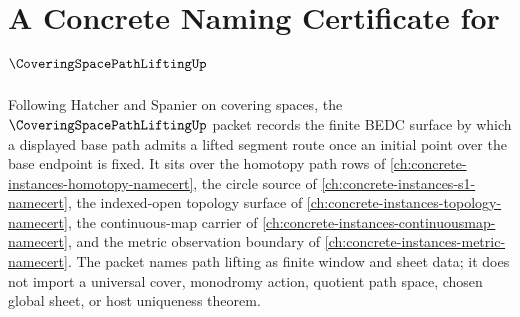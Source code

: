 \chapter{A Concrete Naming Certificate for $\CoveringSpacePathLiftingUp$}
\label{ch:concrete-instances-covering-space-path-lifting-namecert}

Following Hatcher and Spanier on covering spaces, the $\CoveringSpacePathLiftingUp$ packet records the finite BEDC surface by which a displayed base path admits a lifted segment route once an initial point over the base endpoint is fixed. It sits over the homotopy path rows of \autoref{ch:concrete-instances-homotopy-namecert}, the circle source of \autoref{ch:concrete-instances-s1-namecert}, the indexed-open topology surface of \autoref{ch:concrete-instances-topology-namecert}, the continuous-map carrier of \autoref{ch:concrete-instances-continuousmap-namecert}, and the metric observation boundary of \autoref{ch:concrete-instances-metric-namecert}. The packet names path lifting as finite window and sheet data; it does not import a universal cover, monodromy action, quotient path space, chosen global sheet, or host uniqueness theorem.

